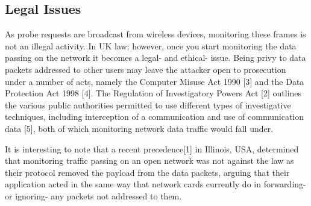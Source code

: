 \subsection{Legal Issues}
As probe requests are broadcast from wireless devices, monitoring these frames is not an illegal activity. In UK law; however, once you start monitoring the data passing on the network it becomes a legal- and ethical- issue. Being privy to data packets addressed to other users may leave the attacker open to prosecution under a number of acts, namely the Computer Misuse Act 1990 [3] and the Data Protection Act 1998 [4]. The Regulation of Investigatory Powers Act [2] outlines the various public authorities permitted to use different types of investigative techniques, including interception of a communication and use of communication data [5], both of which monitoring network data traffic would fall under.

It is interesting to note that a recent precedence[1] in Illinois, USA, determined that monitoring traffic passing on an open network was not against the law as their protocol removed the payload from the data packets, arguing that their application acted in the same way that network cards currently do in forwarding- or ignoring- any packets not addressed to them. 
